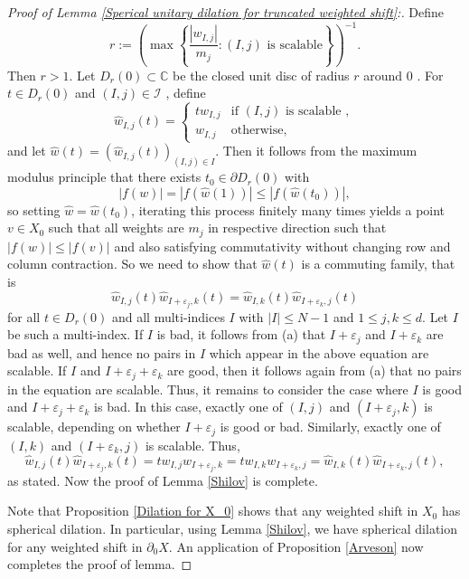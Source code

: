 \documentclass[12pt,reqno] {amsart}
\theoremstyle{remark}
\theoremstyle{definition}
\begin{document}
\begin{proof}[Proof of Lemma \ref{Sperical unitary dilation for truncated weighted shift}:]
Define \[
r := \left( 
\max \left\{ 
\frac{|w_{I,j}|}{m_j} :  (I, j) \text{ is scalable} 
\right\}
\right)^{-1}.
\]
Then \( r> 1\).  Let \( D_r(0) \subset \mathbb{C}\) be the  closed unit disc of radius \(r\)  around 0 . For \(t\in D_r(0)\) and \( 
(I,j)\in \mathcal{I} \) , define 
\[
\hat{w}_{I,j}(t) = 
\begin{cases}
t w_{I,j} & \text{if } (I,j) \text{ is scalable }, \\
w_{I,j} & \text{otherwise},
\end{cases}
\]
and let \( \hat{w}(t) = (\hat{w}_{I,j}(t))_{(I,j) \in I} \). Then it follows from the maximum modulus principle that there exists \( t_0 \in \partial D_r(0) \) with
\[
|f(w)| = |f(\hat{w}(1))| \leq |f(\hat{w}(t_0))|,\] so setting \( \hat{w} = \hat{w}(t_0) \), iterating this process finitely many times yields a point \( v \in {X_0} \) such that all  weights are  \(m_j\) in respective direction  such that \( |f(w)| \leq |f(v)| \) and also satisfying commutativity without changing row and column contraction. So we need to show that \( \hat{w}(t) \) is a commuting family, that is
\[
\hat{w}_{I,j}(t) \hat{w}_{I+\varepsilon_j,k}(t) = \hat{w}_{I,k}(t) \hat{w}_{I+\varepsilon_k,j}(t)
\]
for all \( t \in D_r(0) \) and all multi-indices \( I \) with \( |I| \leq N-1 \) and \( 1 \leq j, k \leq d \).
Let \( I \) be such a multi-index. If \( I \) is bad, it follows from (a) that \( I + \varepsilon_j \) and \( I + \varepsilon_k \) are bad as well, and hence no pairs in \( I \) which appear in the above equation are scalable. If \( I \) and \( I + \varepsilon_j + \varepsilon_k \) are good, then it follows again from (a) that no pairs in the equation are scalable. Thus, it remains to consider the case where \( I \) is good and \( I + \varepsilon_j + \varepsilon_k \) is bad. In this case, exactly one of \( (I,j) \) and \( (I + \varepsilon_j, k) \) is scalable, depending on whether \( I + \varepsilon_j \) is good or bad. Similarly, exactly one of \( (I,k) \) and \( (I + \varepsilon_k, j) \) is scalable. Thus,
\[\hat{w}_{I,j}(t) \hat{w}_{I+\varepsilon_j,k}(t) = t w_{I,j} w_{I+\varepsilon_j,k} = t w_{I,k} w_{I+\varepsilon_k,j} = \hat{w}_{I,k}(t) \hat{w}_{I+\varepsilon_k,j}(t),
\]
as stated. 
Now the proof of Lemma \ref{Shilov} is complete.

Note that Proposition \ref{Dilation for X_0} shows that any weighted shift in $X_0$ has spherical dilation. In particular, using Lemma \ref{Shilov}, we have spherical dilation for any weighted shift in $\partial_0 X.$ An application of Proposition \ref{Arveson} now completes the proof of lemma.
\end{proof}
\end{document}
